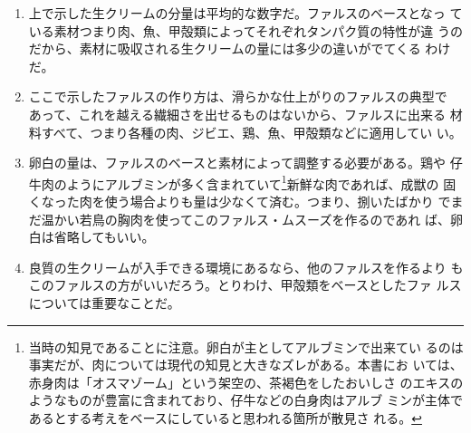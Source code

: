 \begin{recette}
\begin{enumerate}
\def\labelenumi{\arabic{enumi}.}
\item
  上で示した生クリームの分量は平均的な数字だ。ファルスのベースとなっ
  ている素材つまり肉、魚、甲殻類によってそれぞれタンパク質の特性が違
  うのだから、素材に吸収される生クリームの量には多少の違いがでてくる
  わけだ。
\item
  ここで示したファルスの作り方は、滑らかな仕上がりのファルスの典型で
  あって、これを越える繊細さを出せるものはないから、ファルスに出来る
  材料すべて、つまり各種の肉、ジビエ、鶏、魚、甲殻類などに適用してい
  い。
\item
  卵白の量は、ファルスのベースと素材によって調整する必要がある。鶏や
  仔牛肉のようにアルブミンが多く含まれていて\footnote{当時の知見であることに注意。卵白が主としてアルブミンで出来てい
    るのは事実だが、肉については現代の知見と大きなズレがある。本書にお
    いては、赤身肉は「オスマゾーム」という架空の、茶褐色をしたおいしさ
    のエキスのようなものが豊富に含まれており、仔牛などの白身肉はアルブ
    ミンが主体であるとする考えをベースにしていると思われる箇所が散見さ
    れる。}新鮮な肉であれば、成獣の
  固くなった肉を使う場合よりも量は少なくて済む。つまり、捌いたばかり
  でまだ温かい若鳥の胸肉を使ってこのファルス・ムスーズを作るのであれ
  ば、卵白は省略してもいい。
\item
  良質の生クリームが入手できる環境にあるなら、他のファルスを作るより
  もこのファルスの方がいいだろう。とりわけ、甲殻類をベースとしたファ
  ルスについては重要なことだ。
\end{enumerate}
\end{recette}
